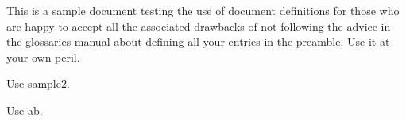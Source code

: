 \documentclass{article}
\begin{document}
\printglossaries

This is a sample document testing the use of document definitions
for those who are happy to accept all the associated drawbacks
of not following the advice in the glossaries manual about
defining all your entries in the preamble. Use it at your own
peril.


Use \gls{sample2}.

Use \gls{ab}.
\end{document}
